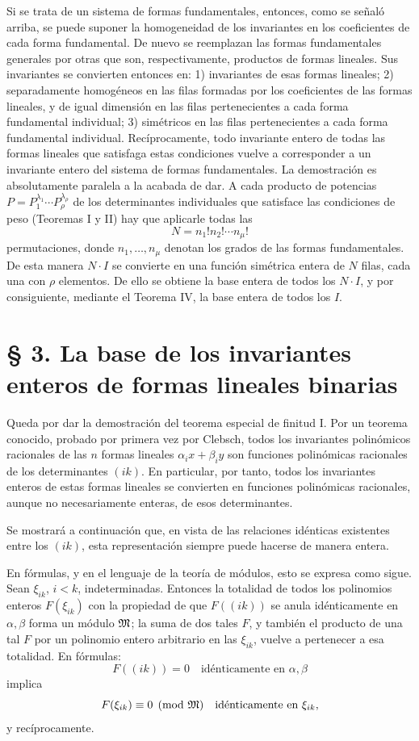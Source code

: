 Si se trata de un sistema de formas fundamentales, entonces, como se señaló arriba, se puede suponer la homogeneidad de los invariantes en los coeficientes de cada forma fundamental. De nuevo se reemplazan las formas fundamentales generales por otras que son, respectivamente, productos de formas lineales. Sus invariantes se convierten entonces en: 1) invariantes de esas formas lineales; 2) separadamente homogéneos en las filas formadas por los coeficientes de las formas lineales, y de igual dimensión en las filas pertenecientes a cada forma fundamental individual; 3) simétricos en las filas pertenecientes a cada forma fundamental individual. Recíprocamente, todo invariante entero de todas las formas lineales que satisfaga estas condiciones vuelve a corresponder a un invariante entero del sistema de formas fundamentales. La demostración es absolutamente paralela a la acabada de dar. A cada producto de potencias \(P=P_1^{\lambda_1}\cdots P_\rho^{\lambda_\rho}\) de los determinantes individuales que satisface las condiciones de peso (Teoremas I y II) hay que aplicarle todas las
\[
        N=n_1!n_2!\cdots n_\mu!
\]
permutaciones, donde \(n_1,\ldots,n_\mu\) denotan los grados de las formas fundamentales. De esta manera \(N\cdot I\) se convierte en una función simétrica entera de \(N\) filas, cada una con \(\rho\) elementos. De ello se obtiene la base entera de todos los \(N\cdot I\), y por consiguiente, mediante el Teorema IV, la base entera de todos los \(I\).

\setcounter{equation}{0}
\section*{§ 3. La base de los invariantes enteros de formas lineales binarias}

Queda por dar la demostración del teorema especial de finitud I. Por un teorema conocido, probado por primera vez por Clebsch, todos los invariantes polinómicos racionales de las \(n\) formas lineales \(\alpha_i x+\beta_i y\) son funciones polinómicas racionales de los determinantes \((ik)\). En particular, por tanto, todos los invariantes enteros de estas formas lineales se convierten en funciones polinómicas racionales, aunque no necesariamente enteras, de esos determinantes.

Se mostrará a continuación que, en vista de las relaciones idénticas existentes entre los \((ik)\), esta representación siempre puede hacerse de manera entera.

En fórmulas, y en el lenguaje de la teoría de módulos, esto se expresa como sigue. Sean \(\xi_{ik}\), \(i<k\), indeterminadas. Entonces la totalidad de todos los polinomios enteros \(F(\xi_{ik})\) con la propiedad de que \(F((ik))\) se anula idénticamente en \(\alpha,\beta\) forma un módulo \(\mathfrak M\); la suma de dos tales \(F\), y también el producto de una tal \(F\) por un polinomio entero arbitrario en las \(\xi_{ik}\), vuelve a pertenecer a esa totalidad. En fórmulas:
\[
        F((ik))=0\quad \text{idénticamente en \(\alpha,\beta\)}
\]
implica
\[
        F(\xi_{ik})\equiv0\pmod{\mathfrak M}\quad \text{idénticamente en \(\xi_{ik}\)},
\]
y recíprocamente.

